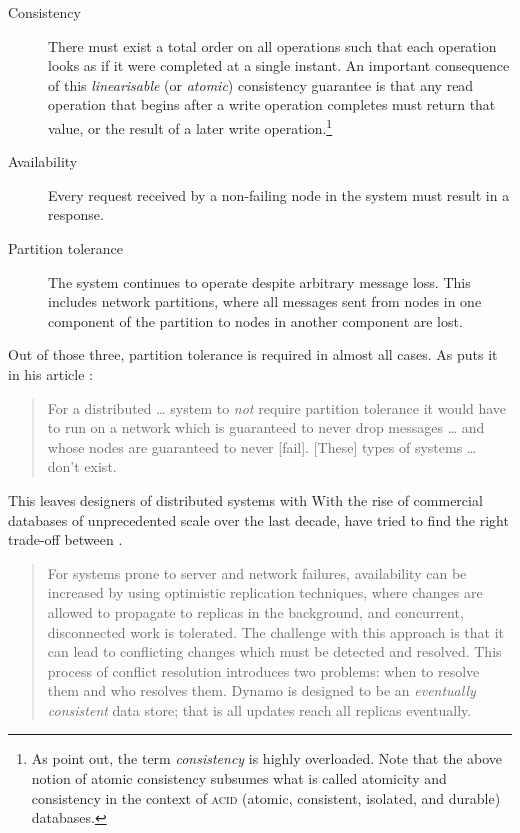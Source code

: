 \documentclass[11pt,chapterprefix=true,toc=bibliography,numbers=noendperiod]{scrreprt}
\begin{document}
\begin{description}
    \item[Consistency] There must exist a total order on all operations such that each operation looks as if it were completed at a single instant. An important consequence of this \emph{linearisable} (or \emph{atomic}) consistency guarantee is that any read operation that begins after a write operation completes must return that value, or the result of a later write operation.\footnote{As \textcite{capproof} point out, the term \emph{consistency} is highly overloaded. Note that the above notion of atomic consistency subsumes what is called atomicity and consistency in the context of \textsc{acid} (atomic, consistent, isolated, and durable) databases.}
    \item[Availability] Every request received by a non-failing node in the system must result in a response.
    \item[Partition tolerance] The system continues to operate despite arbitrary message loss. This includes network partitions, where all messages sent from nodes in one component of the partition to nodes in another component are lost.
\end{description}

Out of those three, partition tolerance is required in almost all cases. As \citeauthor{needp} puts it in his article : \begin{quote}For a distributed \dots{} system to \emph{not} require partition tolerance it would have to run on a network which is guaranteed to never drop messages \dots{} and whose nodes are guaranteed to never [fail]. [These] types of systems \dots{} don't exist.\end{quote}

This leaves designers of distributed systems with With the rise of commercial databases of unprecedented scale over the last decade,  have tried to find the right trade-off between .

\begin{quote}
    For systems prone to server and network failures, availability can be increased by using optimistic replication techniques, where changes are allowed to propagate to replicas in the background, and concurrent, disconnected work is tolerated. The challenge with this approach is that it can lead to conflicting changes which must be detected and resolved. This process of conflict resolution introduces two problems: when to resolve them and who resolves them. Dynamo is designed to be an \emph{eventually consistent} data store; that is all updates reach all replicas eventually.
\end{quote}
\end{document}
